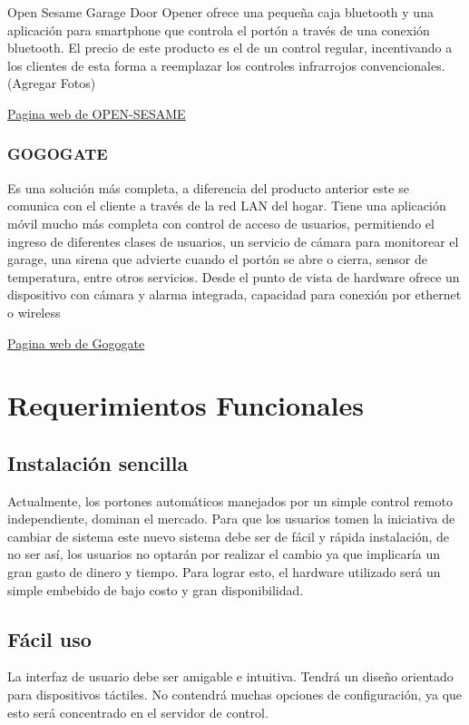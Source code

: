 \documentclass[16pt, article,notitlepage]{article}
\begin{document}
Open Sesame Garage Door Opener ofrece una pequeña caja bluetooth y una aplicación para smartphone que controla el portón a través de una conexión bluetooth. El precio de este producto es el de un control regular, incentivando a los clientes de esta forma a reemplazar los controles infrarrojos convencionales.
(Agregar Fotos)

\href{https://www.mygarageopener.com/}{Pagina web de OPEN-SESAME}



\subsubsection{GOGOGATE}

Es una solución más completa, a diferencia del producto anterior este se comunica con el cliente a través de la red LAN del hogar.  Tiene una aplicación móvil mucho más completa con control de acceso de usuarios, permitiendo el ingreso de diferentes clases de usuarios, un servicio de cámara para monitorear el garage, una sirena que advierte cuando el portón se abre o cierra, sensor de temperatura, entre otros servicios.  Desde el punto de vista de hardware ofrece un dispositivo con cámara y alarma integrada, capacidad para conexión por ethernet o wireless

\href{https://www.gogogate.com/index.html}{Pagina web de Gogogate}

\section{Requerimientos Funcionales}

\subsection{Instalación sencilla}
Actualmente, los portones automáticos manejados por un simple control remoto independiente, dominan el mercado. Para que los usuarios tomen la iniciativa de cambiar de sistema este nuevo sistema debe ser de fácil y rápida instalación, de no ser así, los usuarios no optarán por realizar el cambio ya que implicaría un gran gasto de dinero y tiempo.
Para lograr esto, el hardware utilizado será un simple embebido de bajo costo y gran disponibilidad. 
\subsection{Fácil uso}
La interfaz de usuario debe ser amigable e intuitiva. Tendrá un diseño orientado para dispositivos táctiles. No contendrá muchas opciones de configuración, ya que esto será concentrado en el servidor de control.
\end{document}
